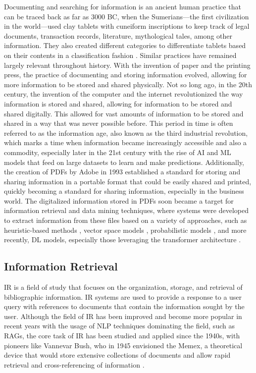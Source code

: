 \documentclass[english, 12pt, a4paper, elec, utf8, a-2b, online]{aaltothesis}
\begin{document}
Documenting and searching for information is an ancient human practice that can be traced back as far as 3000 BC, when the Sumerians—the first civilization in the world—used clay tablets with cuneiform inscriptions to keep track of legal documents, transaction records, literature, mythological tales, among other information.
They also created different categories to differentiate tablets based on their contents in a classification fashion \cite{finkel2015cuneiform}.
Similar practices have remained largely relevant throughout history.
With the invention of paper and the printing press, the practice of documenting and storing information evolved, allowing for more information to be stored and shared physically.
Not so long ago, in the 20th century, the invention of the computer and the internet revolutionized the way information is stored and shared, allowing for information to be stored and shared digitally.
This allowed for vast amounts of information to be stored and shared in a way that was never possible before.
This period in time is often referred to as the information age, also known as the third industrial revolution, which marks a time when information became increasingly accessible and also a commodity, especially later in the 21st century with the rise of \ac{AI} and \ac{ML} models that feed on large datasets to learn and make predictions.
Additionally, the creation of \ac{PDF}s by Adobe in 1993 \cite{adobe2023pdftimeline} established a standard for storing and sharing information in a portable format that could be easily shared and printed, quickly becoming a standard for sharing information, especially in the business world.
The digitalized information stored in \ac{PDF}s soon became a target for information retrieval and data mining techniques, where systems were developed to extract information from these files based on a variety of approaches, such as heuristic-based methods \cite{table_extraction_conditional_pinto_2003, PENG2006963, Fang2004}, vector space models \cite{Salton1975, Wong1987}, probabilistic models \cite{Maron1960}, and more recently, \ac{DL} models, especially those leveraging the transformer architecture \cite{Wang2021, Li2022, Li2023, Xu2020}.

\subsection{Information Retrieval}

\ac{IR} is a field of study that focuses on the organization, storage, and retrieval of bibliographic information.
\ac{IR} systems are used to provide a response to a user query with references to documents that contain the information sought by the user.
Although the field of \ac{IR} has been improved and become more popular in recent years with the usage of \ac{NLP} techniques dominating the field, such as \ac{RAG}s, the core task of \ac{IR} has been studied and applied since the 1940s, with pioneers like Vannevar Bush, who in 1945 envisioned the Memex, a theoretical device that would store extensive collections of documents and allow rapid retrieval and cross-referencing of information \cite{Bush1945As}.
\end{document}
